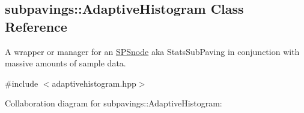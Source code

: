 \hypertarget{classsubpavings_1_1AdaptiveHistogram}{\subsection{subpavings\-:\-:\-Adaptive\-Histogram \-Class \-Reference}
\label{classsubpavings_1_1AdaptiveHistogram}
}


\-A wrapper or manager for an \hyperlink{classsubpavings_1_1SPSnode}{\-S\-P\-Snode} aka \-Stats\-Sub\-Paving in conjunction with massive amounts of sample data.  




{\ttfamily \#include $<$adaptivehistogram.\-hpp$>$}



\-Collaboration diagram for subpavings\-:\-:\-Adaptive\-Histogram\-:
